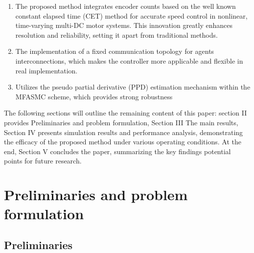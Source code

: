 \documentclass[journal,onecolumn]{IEEEtran}
\begin{document}
\begin{enumerate}

    \item The proposed method integrates encoder counts based on the well known constant elapsed time (CET) method\cite{31} for accurate speed control in nonlinear, time-varying multi-DC motor systems. This innovation greatly enhances resolution and reliability, setting it apart from traditional methods.
    
    \item The implementation of a fixed communication topology for agents interconnections, which makes the controller more applicable and flexible in real implementation.
    
    \item Utilizes the pseudo partial derivative (PPD) estimation mechanism within the MFASMC scheme, which provides strong robustness

\end{enumerate}



    The following sections will outline the remaining content of this paper:
    section II provides Preliminaries and problem formulation, Section III The main results, Section IV presents simulation results and performance analysis, demonstrating the efficacy of the proposed method under various operating conditions.
    At the end, Section V concludes the paper, summarizing the key findings potential points for future research.


\section{Preliminaries and problem formulation}\label{section:2}
\subsection{Preliminaries}
\end{document}
